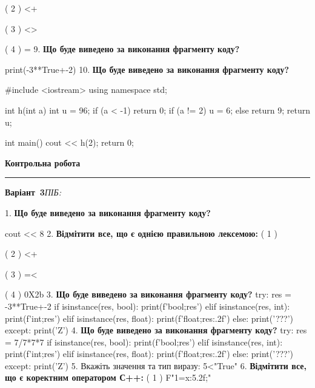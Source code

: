 \documentclass[11pt]{article}
\begin{document}
{{( 2 ) <+

( 3 ) <>

( 4 ) =
\vspace{5mm}
9. \textbf{Що буде виведено за виконання фрагменту коду?}

print(-3**True+-2)
\vspace{5mm}
10. \textbf{Що буде виведено за виконання фрагменту коду?}

#include <iostream>
using namespace std;

int h(int a){
    int u = 96;
    if (a < -1) 
        return 0;
    if (a != 2)
         u = 6;
    else
         return 9;
    return u;
}

int main(){
    cout << h(2);
    return 0;
}

\vspace{5mm}










\newpage

\newpage

{\centering\Large\bfseries Контрольна робота\par}
\medskip
\noindent\rule{\linewidth}{0.5pt}
\smallskip
\noindent\textbf{Варіант \No\,3}\hfill \textit{ПІБ:}\,\underline{\hspace{60mm}}
\vspace{4mm}

1. \textbf{Що буде виведено за виконання фрагменту коду?}

cout << 8 %
\vspace{5mm}
2. %
\textbf{Відмітити все, що є однією правильною лексемою:}
( 1 ) {

( 2 ) <+

( 3 ) =<

( 4 ) 0X2b
\vspace{5mm}
3. \textbf{Що буде виведено за виконання фрагменту коду?}
try:
    res = -3**True+-2
    if isinstance(res, bool):
        print(f'bool;{res}')
    elif isinstance(res, int):
        print(f'int;{res}')
    elif isinstance(res, float):
        print(f'float;{res:.2f}')
    else:
        print('???')
except:
    print('Z')
\vspace{5mm}
4. \textbf{Що буде виведено за виконання фрагменту коду?}
try:
    res = 7/7*7*7
    if isinstance(res, bool):
        print(f'bool;{res}')
    elif isinstance(res, int):
        print(f'int;{res}')
    elif isinstance(res, float):
        print(f'float;{res:.2f}')
    else:
        print('???')
except:
    print('Z')
\vspace{5mm}
5. 
Вкажіть значення та тип виразу:
5<"True"
\vspace{5mm}
6. %
\textbf{Відмітити все, що є коректним оператором С++:}
( 1 ) F"1={x:5.2f};"

}}}
\end{document}
